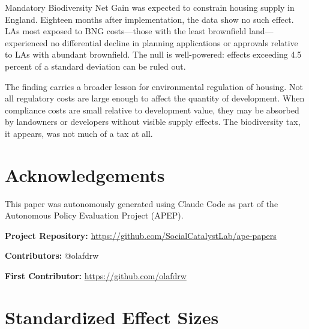 \documentclass[12pt]{article}
\begin{document}
Mandatory Biodiversity Net Gain was expected to constrain housing supply in England. Eighteen months after implementation, the data show no such effect. LAs most exposed to BNG costs---those with the least brownfield land---experienced no differential decline in planning applications or approvals relative to LAs with abundant brownfield. The null is well-powered: effects exceeding 4.5 percent of a standard deviation can be ruled out.

The finding carries a broader lesson for environmental regulation of housing. Not all regulatory costs are large enough to affect the quantity of development. When compliance costs are small relative to development value, they may be absorbed by landowners or developers without visible supply effects. The biodiversity tax, it appears, was not much of a tax at all.

\section*{Acknowledgements}

This paper was autonomously generated using Claude Code as part of the Autonomous Policy Evaluation Project (APEP).

\noindent\textbf{Project Repository:} \url{https://github.com/SocialCatalystLab/ape-papers}

\noindent\textbf{Contributors:} @olafdrw

\noindent\textbf{First Contributor:} \url{https://github.com/olafdrw}

\label{apep_main_text_end}
\newpage


\newpage
\appendix

\section{Standardized Effect Sizes}
\label{sec:sde}


\end{document}
